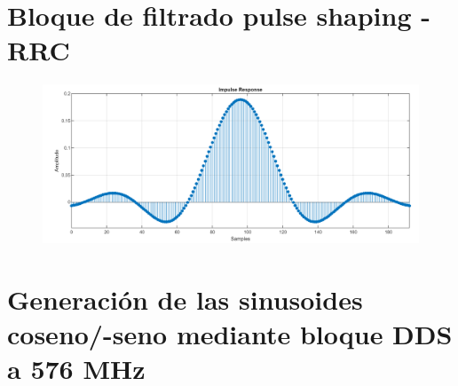 \section*{Bloque de filtrado pulse shaping - RRC}







\vspace{3mm}

    \begin{figure}[h]
    	\centering
    	\includegraphics[width=1\textwidth]{img/matlab/rrc.PNG}
    	\caption{}
    	\label{fig:rrc}
    \end{figure}
    
\vspace{3mm}




\section*{Generación de las sinusoides coseno/-seno mediante bloque DDS a 576 MHz }